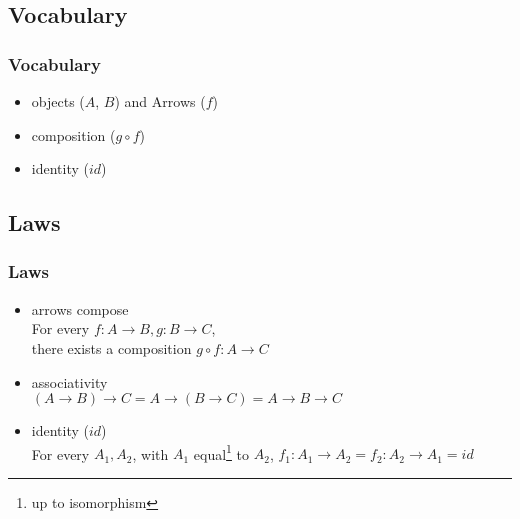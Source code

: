 \documentclass{beamer}
\begin{document}
\subsection{Vocabulary}
\begin{frame}[fragile]
  \frametitle{Vocabulary}
  \begin{itemize}
  \item objects ($A$, $B$) and Arrows ($f$) 
    \begin{flushright}
    \end{flushright}
  \item composition ($g \circ f$)
    \begin{flushright}
    \end{flushright}
  \item identity ($id$)
    \begin{flushright}
    \end{flushright}
  \end{itemize}
\end{frame}

\subsection{Laws}
\begin{frame}[fragile]
  \frametitle{Laws}
  \begin{itemize}
  \item arrows compose \\
    For every $f: A \to B, g: B \to C$, \\
    there exists a composition $g \circ f: A \to C$
  \item associativity \\
    $(A \to B) \to C = A \to (B \to C) = A \to B \to C$
  \item identity ($id$) \\
    For every $A_1, A_2$, with $A_1$ equal\footnote{up to isomorphism} to $A_2$,
    $f_1: A_1 \to A_2 = f_2: A_2 \to A_1 = id$
  \end{itemize}
\end{frame}
\end{document}
